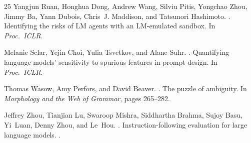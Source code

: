 \documentclass[11pt]{article}
\begin{document}
\begin{thebibliography}{25}
Yangjun Ruan, Honghua Dong, Andrew Wang, Silviu Pitis, Yongchao Zhou, Jimmy Ba, Yann Dubois, Chris~J. Maddison, and Tatsunori Hashimoto.
.
\newblock Identifying the risks of LM agents with an LM-emulated sandbox.
\newblock In {\em Proc.\ ICLR}.

Melanie Sclar, Yejin Choi, Yulia Tsvetkov, and Alane Suhr.
.
\newblock Quantifying language models' sensitivity to spurious features in prompt design.
\newblock In {\em Proc.\ ICLR}.

Thomas Wasow, Amy Perfors, and David Beaver.
.
\newblock The puzzle of ambiguity.
\newblock In {\em Morphology and the Web of Grammar}, pages 265--282.

Jeffrey Zhou, Tianjian Lu, Swaroop Mishra, Siddhartha Brahma, Sujoy Basu, Yi~Luan, Denny Zhou, and Le~Hou.
.
\newblock Instruction-following evaluation for large language models.
.

\end{thebibliography}
\end{document}
